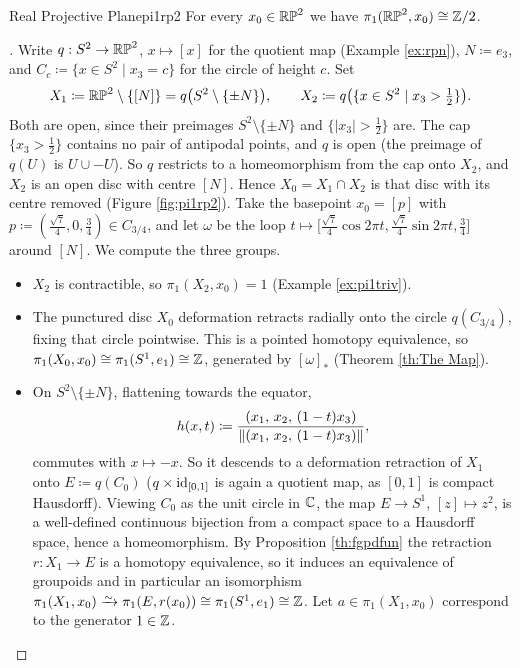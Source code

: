 \label{fig:pi1sn}

\newpage



\begin{example}{Real Projective Plane}{pi1rp2}
  For every $x_0\in\mathbb{RP}^{2}$ we have $\pi_1(\mathbb{RP}^{2},x_0)\cong\mathbb{Z}/2$.
\end{example}

\begin{proof}[]
  Write $q:S^2\to\mathbb{RP}^{2}$, $x\mapsto[x]$ for the quotient map (Example \ref{ex:rpn}), $N\coloneq e_3$, and $C_c\coloneq\{x\in S^2\mid x_3=c\}$ for the circle of height $c$. Set \[
    X_1\coloneq\mathbb{RP}^{2}\setminus\{[N]\}=q\big(S^2\setminus\{\pm N\}\big),\qquad X_2\coloneq q\big(\{x\in S^2\mid x_3>\tfrac12\}\big).
  \]
  Both are open, since their preimages $S^2\setminus\{\pm N\}$ and $\{\lvert x_3\rvert>\frac12\}$ are. The cap $\{x_3>\frac12\}$ contains no pair of antipodal points, and $q$ is open (the preimage of $q(U)$ is $U\cup-U$). So $q$ restricts to a homeomorphism from the cap onto $X_2$, and $X_2$ is an open disc with centre $[N]$. Hence $X_0=X_1\cap X_2$ is that disc with its centre removed (Figure \ref{fig:pi1rp2}). Take the basepoint $x_0=[p]$ with $p\coloneq(\tfrac{\sqrt7}{4},0,\tfrac34)\in C_{3/4}$, and let $\omega$ be the loop $t\mapsto\big[\tfrac{\sqrt7}{4}\cos2\pi t,\tfrac{\sqrt7}{4}\sin2\pi t,\tfrac34\big]$ around $[N]$. We compute the three groups.
  \begin{itemize}
    \item $X_2$ is contractible, so $\pi_1(X_2,x_0)=1$ (Example \ref{ex:pi1triv}).
    \item The punctured disc $X_0$ deformation retracts radially onto the circle $q(C_{3/4})$, fixing that circle pointwise. This is a pointed homotopy equivalence, so $\pi_1(X_0,x_0)\cong\pi_1(S^1,e_1)\cong\mathbb{Z}$, generated by $[\omega]_*$ (Theorem \ref{th:The Map}).
    \item On $S^2\setminus\{\pm N\}$, flattening towards the equator, \[
      h(x,t)\coloneq\frac{(x_1,\,x_2,\,(1-t)x_3)}{\lVert(x_1,\,x_2,\,(1-t)x_3)\rVert},
    \]
    commutes with $x\mapsto-x$. So it descends to a deformation retraction of $X_1$ onto $E\coloneq q(C_0)$ ($q\times\operatorname{id}_{[0,1]}$ is again a quotient map, as $[0,1]$ is compact Hausdorff). Viewing $C_0$ as the unit circle in $\mathbb{C}$, the map $E\to S^1$, $[z]\mapsto z^2$, is a well-defined continuous bijection from a compact space to a Hausdorff space, hence a homeomorphism. By Proposition \ref{th:fgpdfun} the retraction $r:X_1\to E$ is a homotopy equivalence, so it induces an equivalence of groupoids and in particular an isomorphism $\pi_1(X_1,x_0)\isoto\pi_1(E,r(x_0))\iso\pi_1(S^1,e_1)\iso\Z$. Let $a\in\pi_1(X_1,x_0)$ correspond to the generator $1\in\mathbb{Z}$.

\end{itemize}
\end{proof}
